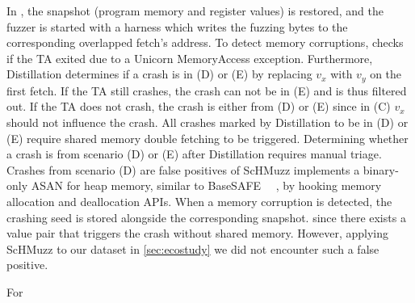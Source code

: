\documentclass[conference]{IEEEtran} %
\newcommand{\sysname}{ScHMuzz\xspace}
\newcommand{\stagetwo}{Fetch-Anchored Fuzzing\xspace} %
\newcommand{\stagethree}{Distillation\xspace}
\providecommand{\DIFaddtex}[1]{{\protect\color{blue} \sf #1}} %
\providecommand{\DIFdeltex}[1]{{\protect\color{red} \scriptsize #1}} %
\providecommand{\DIFaddbegin}{} %
\providecommand{\DIFaddend}{} %
\providecommand{\DIFdelbegin}{} %
\providecommand{\DIFdelend}{} %
\providecommand{\DIFadd}[1]{\texorpdfstring{\DIFaddtex{#1}}{#1}} %
\providecommand{\DIFdel}[1]{\texorpdfstring{\DIFdeltex{#1}}{}} %
\begin{document}
\DIFdelbegin \DIFdel{In }%
\DIFdel{, the snapshot (program memory and register values) is restored, and the fuzzer is started with a harness which 
writes the fuzzing bytes to the corresponding overlapped fetch's address. To detect memory corruptions, }%
\DIFdel{checks if 
the TA exited due to a Unicorn MemoryAccess exception. Furthermore, }\DIFdelend %
\DIFaddbegin \stagethree \DIFadd{determines if a crash is in (D) or (E)
by replacing $v_x$ with $v_y$ on the first fetch. If the TA still 
crashes, the crash can not be in (E) and is thus filtered out. If the TA does not crash, the crash is either from 
(D) or (E) since in (C) $v_x$ should not influence the crash. All crashes marked by 
}\stagethree \DIFadd{to be in (D) or (E) require shared memory double fetching to be triggered.
Determining whether a crash is from scenario (D) or (E) after }\stagethree \DIFadd{requires 
manual triage. Crashes from scenario (D) are false positives of }\DIFaddend \sysname \DIFdelbegin \DIFdel{implements a binary-only ASAN for heap memory, 
similar to BaseSAFE~\mbox{%
\cite{basesafe}}\hskip0pt%
, by hooking memory allocation and deallocation APIs. When a memory corruption is detected, 
the crashing seed is stored alongside the corresponding snapshot.
}\DIFdelend \DIFaddbegin \DIFadd{since there 
exists a value pair that triggers the crash without shared memory. 
However, applying }\sysname \DIFadd{to our dataset in }\autoref{sec:ecostudy} \DIFadd{we did not encounter such a false positive.
}\DIFaddend 


\DIFdelbegin \DIFdel{For }\DIFdelend %
\DIFaddbegin 
\end{document}
